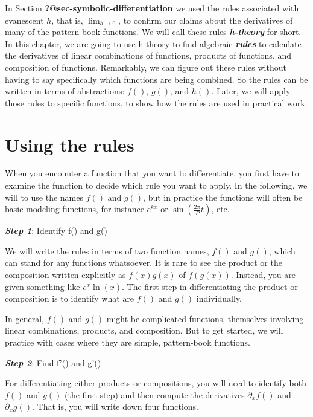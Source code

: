 \documentclass[
  letterpaper,
  DIV=11,
  numbers=noendperiod,
  oneside]{scrreprt}
\begin{document}
In Section \textbf{?@sec-symbolic-differentiation} we used the rules
associated with evanescent \(h\), that is, \(\lim_{h\rightarrow 0}\), to
confirm our claims about the derivatives of many of the pattern-book
functions. We will call these rules \textbf{\emph{h-theory}} for short.
In this chapter, we are going to use h-theory to find algebraic
\textbf{\emph{rules}} to calculate the derivatives of linear
combinations of functions, products of functions, and composition of
functions. Remarkably, we can figure out these rules without having to
say specifically which functions are being combined. So the rules can be
written in terms of abstractions: \(f()\), \(g()\), and \(h()\). Later,
we will apply those rules to specific functions, to show how the rules
are used in practical work.

\hypertarget{sec-using-the-rules}{%
\section{Using the rules}\label{sec-using-the-rules}}

When you encounter a function that you want to differentiate, you first
have to examine the function to decide which rule you want to apply. In
the following, we will to use the names \(f()\) and \(g()\), but in
practice the functions will often be basic modeling functions, for
instance \(e^{kx}\) or \(\sin\left(\frac{2\pi}{P}t\right)\), etc.

\textbf{\emph{Step 1}}: Identify f() and g()

We will write the rules in terms of two function names, \(f()\) and
\(g()\), which can stand for any functions whatsoever. It is rare to see
the product or the composition written explicitly as \(f(x)g(x)\) of
\(f(g(x))\). Instead, you are given something like \(e^x \ln(x)\). The
first step in differentiating the product or composition is to identify
what are \(f()\) and \(g()\) individually.

In general, \(f()\) and \(g()\) might be complicated functions,
themselves involving linear combinations, products, and composition. But
to get started, we will practice with cases where they are simple,
pattern-book functions.

\textbf{\emph{Step 2}}: Find f'() and g'()

For differentiating either products or compositions, you will need to
identify both \(f()\) and \(g()\) (the first step) and then compute the
derivatives \(\partial_x f()\) and \(\partial_x g()\). That is, you will
write down four functions.
\end{document}
